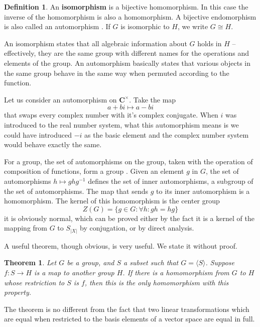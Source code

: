 \documentclass[12pt]{amsbook}
\theoremstyle{plain}
\newtheorem{theorem}{Theorem}[chapter]
\theoremstyle{definition}
\newtheorem{definition}{Definition}
\begin{document}
\begin{definition}
    An {\bf isomorphism}  is a bijective homomorphism. In this case the inverse of the homomorphism is also a homomorphism. A bijective endomorphism is also called an automorphism . If $G$ is isomorphic to $H$, we write $G \cong H$.
\end{definition}

An isomorphism states that all algebraic information about $G$ holds in $H$ -- effectively, they are the same group with different names for the operations and elements of the group. An automorphism basically states that various objects in the same group behave in the same way when permuted according to the function.

Let us consider an automorphism on $\mathbf{C}^\times$. Take the map
%
\[ a + bi \mapsto a - bi \]
%
that swaps every complex number with it's complex conjugate. When $i$ was introduced to the real number system, what this automorphism means is we could have introduced $-i$ as the basic element and the complex number system would behave exactly the same.

For a group, the set of automorphisms on the group, taken with the operation of composition of functions, form a group . Given an element $g$ in $G$, the set of automorphisms $h \mapsto ghg^{-1}$ defines the set of inner automorphisms, a subgroup of the set of automorphisms. The map that sends $g$ to its inner automorphism is a homomorphism. The kernel of this homomorphism is the center group
%
\[Z(G) = \{ g \in G : \forall h: gh = hg \}\]
%
it is obviously normal, which can be proved either by the fact it is a kernel of the mapping from $G$ to $S_{|X|}$ by conjugation, or by direct analysis.

A useful theorem, though obvious, is very useful. We state it without proof.

\begin{theorem}
    Let $G$ be a group, and $S$ a subset such that $G = \langle S \rangle$. Suppose $f:S \to H$ is a map to another group $H$. If there is a homomorphism from $G$ to $H$ whose restriction to $S$ is $f$, then this is the only homomorphism with this property.
\end{theorem}

The theorem is no different from the fact that two linear transformations which are equal when restricted to the basis elements of a vector space are equal in full.
\end{document}
